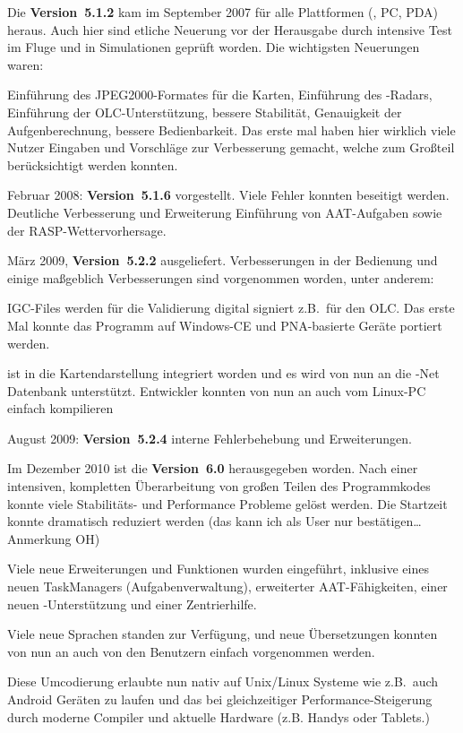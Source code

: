 Die {\bf Version~5.1.2} kam im September 2007 für alle Plattformen (\xc, PC, PDA) heraus.
Auch hier sind etliche Neuerung vor der Herausgabe  durch intensive Test im Fluge und in Simulationen geprüft worden.
Die wichtigsten Neuerungen waren: 

Einführung des JPEG2000-Formates für die Karten, Einführung des \fl-Radars, Einführung der
OLC-Unterstützung, bessere Stabilität, Genauigkeit der Aufgenberechnung, bessere Bedienbarkeit.
Das erste mal haben hier wirklich viele Nutzer Eingaben und Vorschläge zur Verbesserung gemacht,
welche  zum Großteil berücksichtigt werden konnten.

Februar 2008:  {\bf Version~5.1.6} vorgestellt. Viele Fehler konnten beseitigt werden. Deutliche Verbesserung und
Erweiterung Einführung von AAT-Aufgaben sowie der RASP-Wettervorhersage.

März 2009, {\bf Version~5.2.2} ausgeliefert. Verbesserungen in der Bedienung und einige maßgeblich Verbesserungen sind
vorgenommen worden, unter anderem:

IGC-Files werden für die Validierung digital signiert z.B.\ für den OLC. Das erste Mal konnte das Programm auf Windows-CE 
und PNA-basierte Geräte portiert werden.

\fl ist in die Kartendarstellung integriert worden und es wird von nun an die \fl-Net Datenbank unterstützt.
Entwickler konnten von nun an \xc auch vom Linux-PC einfach kompilieren

August  2009: {\bf Version~5.2.4} interne Fehlerbehebung und Erweiterungen.

Im Dezember 2010 ist die {\bf Version~6.0} herausgegeben worden.
Nach einer intensiven, kompletten  Überarbeitung von großen Teilen des Programmkodes konnte viele Stabilitäts- und Performance
Probleme gelöst werden. Die Startzeit konnte dramatisch reduziert werden {(\small das kann ich als User nur bestätigen\dots Anmerkung OH)}

Viele neue Erweiterungen und Funktionen wurden eingeführt, inklusive eines neuen TaskManagers (Aufgabenverwaltung), 
erweiterter AAT-Fähigkeiten, einer neuen \fl-Unterstützung und einer Zentrierhilfe. 

Viele neue Sprachen standen zur Verfügung, und neue Übersetzungen konnten von nun an auch von
den Benutzern einfach vorgenommen werden.

Diese Umcodierung erlaubte \xc nun nativ auf Unix/Linux Systeme wie z.B.\ auch Android Geräten zu laufen
und das bei gleichzeitiger Performance-Steigerung durch moderne Compiler und aktuelle Hardware (z.B. Handys oder Tablets.)


